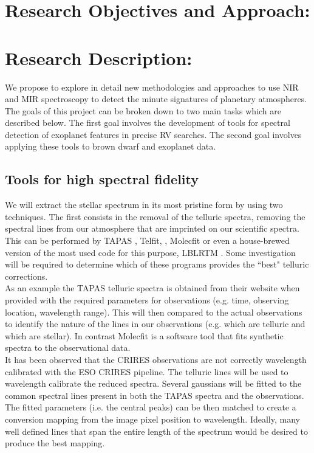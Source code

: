 \documentclass[pdftex,12pt,a4paper]{article}
\begin{document}
\pagebreak
\section{Research Objectives and Approach:}
\section*{Research Description:}
We propose to explore in detail new methodologies and approaches to use NIR and MIR spectroscopy to detect the minute signatures of planetary atmospheres. The goals of this project can be broken down to two main tasks which are described below. The first goal involves the development of tools for spectral detection of exoplanet features in precise RV searches. The second goal involves applying these tools to brown dwarf and exoplanet data.\\

\subsection {Tools for high spectral fidelity}

We will extract the stellar spectrum in its most pristine form by using two techniques. The first consists in the removal of the telluric spectra, removing the spectral lines from our atmosphere that are imprinted on our scientific spectra. This can be performed by TAPAS \citep{Bertaux2014}, Telfit, \citep{Telfit2014}, Molecfit \citep{Molecfit2015, Kausch2015} or even a house-brewed version of the most used code for this purpose, LBLRTM \citep{LBLRTM2014}. Some investigation will be required to determine which of these programs provides the ``best" telluric corrections.\\

As an example the TAPAS telluric spectra is obtained from their website when provided with the required parameters for observations (e.g. time, observing location, wavelength range). This will then compared to the actual observations to identify the nature of the lines in our observations (e.g. which are telluric and which are stellar). In contrast Molecfit is a software tool that fits synthetic spectra to the observational data. \\

It has been observed that the CRIRES observations are not correctly wavelength calibrated with the ESO CRIRES pipeline. The telluric lines will be used to wavelength calibrate the reduced spectra. Several gaussians will be fitted to the common spectral lines present in both the TAPAS spectra and the observations. The fitted parameters (i.e. the central peaks) can be then matched to create a conversion mapping from the image pixel position to wavelength. Ideally, many well defined lines that span the entire length of the spectrum would be desired to produce the best mapping.\\
\end{document}

